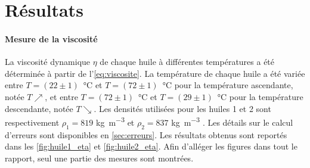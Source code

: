 \section{Résultats}

\paragraph{Mesure de la viscosité} La viscosité dynamique \(\eta\) de chaque huile à différentes températures a été déterminée à partir de l'\autoref{eq:viscosite}. La température de chaque huile a été variée entre \mbox{\(T=(22 \pm 1)\) \si{\celsius}} et \mbox{\(T=(72 \pm 1)\) \si{\celsius}} pour la température ascendante, notée \(T\nearrow\), et entre \mbox{\(T=(72 \pm 1)\) \si{\celsius}} et \mbox{\(T=(29 \pm 1)\) \si{\celsius}} pour la température descendante, notée \(T\searrow\). Les densités utilisées pour les huiles 1 et 2 sont respectivement \(\rho_1 = 819\) \si{\kilo\gram\per\cubic\meter} et \(\rho_2 = 837\) \si{\kilo\gram\per\cubic\meter} \cite{val_ref}. Les détails sur le calcul d'erreurs sont disponibles en \autoref{sec:erreurs}. Les résultats obtenus sont reportés dans les \autoref{fig:huile1_eta} et \autoref{fig:huile2_eta}. Afin d'alléger les figures dans tout le rapport, seul une partie des mesures sont montrées.

